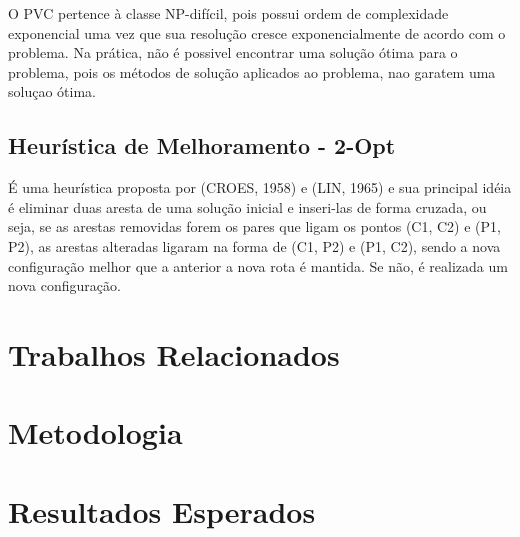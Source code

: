 \documentclass[
	12pt,				%
	openright,			%
	twoside,			%
	a4paper,			%
	chapter=TITLE,		%
	section=TITLE,		%
	english,			%
	french,				%
	spanish,			%
	brazil				%
	]{abntex2}
\begin{document}
O PVC pertence à classe NP-difícil, pois possui ordem de complexidade exponencial uma vez que sua resolução cresce exponencialmente de acordo com o problema. Na prática, não é possivel encontrar uma solução ótima para o problema, pois os métodos de solução aplicados ao problema, nao garatem uma soluçao ótima.

\section{Heurística de Melhoramento - 2-Opt}
É uma heurística proposta por (CROES, 1958) e (LIN, 1965) e sua principal idéia é eliminar duas aresta de uma solução inicial e inseri-las de forma cruzada, ou seja, se as arestas removidas forem os pares que ligam os pontos  (C1, C2) e (P1, P2), as arestas alteradas ligaram na forma de (C1, P2) e (P1, C2), sendo a nova configuração melhor que a anterior a nova rota é mantida. Se não, é realizada um nova configuração.






\chapter{Trabalhos Relacionados}

\chapter{Metodologia}
\chapter{Resultados Esperados}

\end{document}
